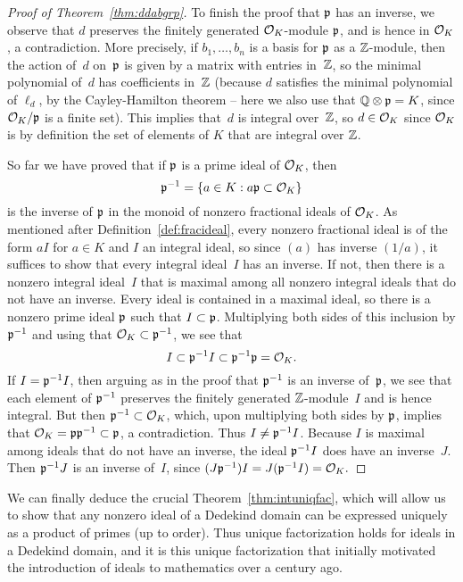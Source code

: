\begin{proof}[Proof of Theorem~\ref{thm:ddabgrp}]
To finish the proof that $\mathfrak{p}$ has an inverse, we observe that $d$
preserves the finitely generated $\mathcal{O}_K$-module $\mathfrak{p}$, and is hence in $\mathcal{O}_K$, a
contradiction.  More precisely, if $b_1,\ldots, b_n$ is a basis for
$\mathfrak{p}$ as a $\mathbb{Z}$-module, then the action of~$d$ on~$\mathfrak{p}$ is given by a
matrix with entries in~$\mathbb{Z}$, so the minimal polynomial of~$d$ has
coefficients in~$\mathbb{Z}$ (because $d$ satisfies the minimal polynomial of
$\ell_d$, by the Cayley-Hamilton theorem -- here we also use that
$\mathbb{Q}\otimes\mathfrak{p} = K$, since $\mathcal{O}_K/\mathfrak{p}$ is a finite set).  This implies
that~$d$ is integral over~$\mathbb{Z}$, so $d\in \mathcal{O}_K$ since $\mathcal{O}_K$ is by
definition the set of elements of $K$ that are integral over $\mathbb{Z}$.

So far we have proved that if $\mathfrak{p}$ is a prime ideal of $\mathcal{O}_K$, then
$$
  \mathfrak{p}^{-1} = \{a \in K : a\mathfrak{p} \subset \mathcal{O}_K\}
$$
is the inverse of $\mathfrak{p}$ in
the monoid of nonzero fractional ideals of $\mathcal{O}_K$.  As mentioned after
Definition~\ref{def:fracideal}, every nonzero fractional
ideal is of the form $aI$ for $a\in K$ and $I$ an integral ideal, so
since $(a)$ has inverse $(1/a)$, it suffices to show that every
integral ideal~$I$ has an inverse.  If not, then there is a nonzero
integral ideal~$I$ that is maximal among all nonzero integral ideals
that do not have an inverse.  Every ideal is contained in a maximal
ideal, so there is a nonzero prime ideal $\mathfrak{p}$ such that $I\subset \mathfrak{p}$.
Multiplying both sides of this inclusion by $\mathfrak{p}^{-1}$ and using that
$\mathcal{O}_K\subset \mathfrak{p}^{-1}$, we see that
$$
  I \subset \mathfrak{p}^{-1} I \subset \mathfrak{p}^{-1}\mathfrak{p} = \mathcal{O}_K.
$$
If $I = \mathfrak{p}^{-1} I$, then arguing as in the proof that $\mathfrak{p}^{-1}$ is an
inverse of~$\mathfrak{p}$, we see that each element of $\mathfrak{p}^{-1}$ preserves the
finitely generated $\mathbb{Z}$-module~$I$ and is hence integral.  But then
$\mathfrak{p}^{-1}\subset \mathcal{O}_K$, which, upon multiplying both sides by $\mathfrak{p}$,
implies that $\mathcal{O}_K = \mathfrak{p} \mathfrak{p}^{-1} \subset \mathfrak{p}$, a contradiction.
Thus $I \neq \mathfrak{p}^{-1} I$.  Because $I$ is
maximal among ideals that do not have an inverse, the ideal $\mathfrak{p}^{-1}
I$ does have an inverse~$J$.
Then $\mathfrak{p}{}^{-1}J$ is an inverse of~$I$, since
$
(J\mathfrak{p}^{-1})I = J(\mathfrak{p}^{-1}I) = \mathcal{O}_K.
$
\end{proof}

We can finally deduce the crucial Theorem~\ref{thm:intuniqfac}, which
will allow us to show that any nonzero ideal of a Dedekind domain can
be expressed uniquely as a product of primes (up to order).  Thus
unique factorization holds for ideals in a Dedekind domain, and it is
this unique factorization that initially motivated the introduction of
ideals to mathematics over a century ago.

